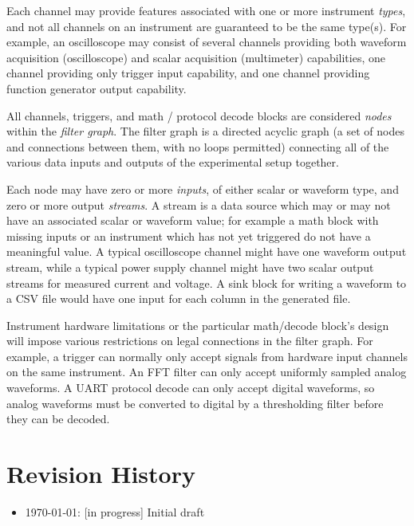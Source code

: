 Each channel may provide features associated with one or more instrument \emph{types}, and not all channels on an
instrument are guaranteed to be the same type(s). For example, an oscilloscope may consist of several channels
providing both waveform acquisition (oscilloscope) and scalar acquisition (multimeter) capabilities, one channel
providing only trigger input capability, and one channel providing function generator output capability.

All channels, triggers, and math / protocol decode blocks are considered \emph{nodes} within the \emph{filter graph}.
The filter graph is a directed acyclic graph (a set of nodes and connections between them, with no loops permitted)
connecting all of the various data inputs and outputs of the experimental setup together.

Each node may have zero or more \emph{inputs}, of either scalar or waveform type, and zero or more output
\emph{streams}. A stream is a data source which may or may not have an associated scalar or waveform value; for example
a math block with missing inputs or an instrument which has not yet triggered do not have a meaningful value. A typical
oscilloscope channel might have one waveform output stream, while a typical power supply channel might have two scalar
output streams for measured current and voltage. A sink block for writing a waveform to a CSV file would have one input
for each column in the generated file.

Instrument hardware limitations or the particular math/decode block's design will impose various restrictions on legal
connections in the filter graph. For example, a trigger can normally only accept signals from hardware input channels
on the same instrument. An FFT filter can only accept uniformly sampled analog waveforms. A UART protocol decode can
only accept digital waveforms, so analog waveforms must be converted to digital by a thresholding filter before they
can be decoded.

\section{Revision History}
\begin{itemize}
\item \today: [in progress] Initial draft
\end{itemize}
